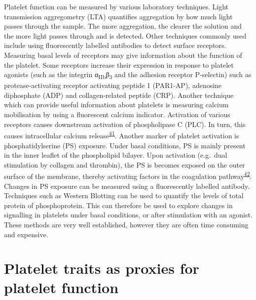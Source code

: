 \documentclass[11pt,twoside]{bristolthesis}
\begin{document}
Platelet function can be measured by various laboratory techniques. Light transmission aggregometry (LTA) quantifies aggregation by how much light passes through the sample. The more aggregation, the clearer the solution and the more light passes through and is detected. Other techniques commonly used include using fluorescently labelled antibodies to detect surface receptors. Measuring basal levels of receptors may give information about the function of the platelet. Some receptors increase their expression in response to platelet agonists (such as the integrin α\textsubscript{IIb}β\textsubscript{3} and the adhesion receptor P-selectin) such as protease-activating receptor activating peptide 1 (PAR1-AP), adenosine diphosphate (ADP) and collagen-related peptide (CRP). Another technique which can provide useful information about platelets is measuring calcium mobilisation by using a fluorescent calcium indicator. Activation of various receptors causes downstream activation of phospholipase C (PLC). In turn, this causes intracellular calcium release\textsuperscript{\protect\hyperlink{ref-Varga-Szabo2009}{41}}. Another marker of platelet activation is phosphatidylserine (PS) exposure. Under basal conditions, PS is mainly present in the inner leaflet of the phospholipid bilayer. Upon activation (e.g.~dual stimulation by collagen and thrombin), the PS is becomes exposed on the outer surface of the membrane, thereby activating factors in the coagulation pathway\textsuperscript{\protect\hyperlink{ref-Bevers1983}{42}}. Changes in PS exposure can be measured using a fluorescently labelled antibody. Techniques such as Western Blotting can be used to quantify the levels of total protein of phosphoprotein. This can therefore be used to explore changes in signalling in platelets under basal conditions, or after stimulation with an agonist. These methods are very well established, however they are often time consuming and expensive.

\hypertarget{platelet-traits-as-proxies-for-platelet-function}{%
\section{Platelet traits as proxies for platelet function}\label{platelet-traits-as-proxies-for-platelet-function}}
\end{document}
